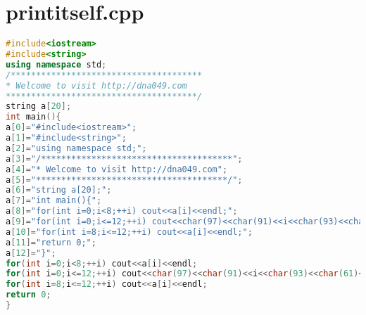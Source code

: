 \section{printitself.cpp}
\begin{lstlisting}[language=c++]
#include<iostream>
#include<string>
using namespace std;
/**************************************
* Welcome to visit http://dna049.com
**************************************/
string a[20];
int main(){
a[0]="#include<iostream>";
a[1]="#include<string>";
a[2]="using namespace std;";
a[3]="/**************************************";
a[4]="* Welcome to visit http://dna049.com";
a[5]="**************************************/";
a[6]="string a[20];";
a[7]="int main(){";
a[8]="for(int i=0;i<8;++i) cout<<a[i]<<endl;";
a[9]="for(int i=0;i<=12;++i) cout<<char(97)<<char(91)<<i<<char(93)<<char(61)<<char(34)<<a[i]<<char(34)<<char(59)<<endl;";
a[10]="for(int i=8;i<=12;++i) cout<<a[i]<<endl;";
a[11]="return 0;";
a[12]="}";
for(int i=0;i<8;++i) cout<<a[i]<<endl;
for(int i=0;i<=12;++i) cout<<char(97)<<char(91)<<i<<char(93)<<char(61)<<char(34)<<a[i]<<char(34)<<char(59)<<endl;
for(int i=8;i<=12;++i) cout<<a[i]<<endl;
return 0;
}

\end{lstlisting}
